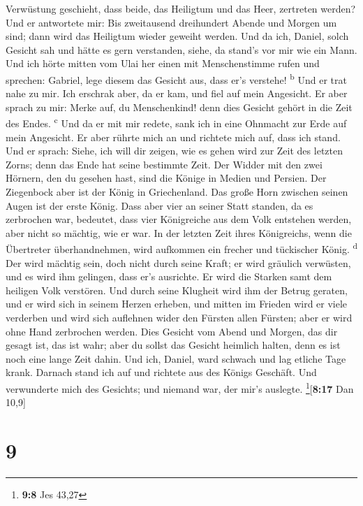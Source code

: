Verwüstung geschieht, dass beide, das Heiligtum und das Heer, zertreten
werden?  Und er antwortete mir: Bis zweitausend
dreihundert Abende und Morgen um sind; dann wird das Heiligtum wieder
geweiht werden.  Und da ich, Daniel, solch Gesicht sah
und hätte es gern verstanden, siehe, da stand's vor mir wie ein Mann.
 Und ich hörte mitten vom Ulai her einen mit
Menschenstimme rufen und sprechen: Gabriel, lege diesem das Gesicht aus,
dass er's verstehe! \textsuperscript{b}  Und er trat nahe
zu mir. Ich erschrak aber, da er kam, und fiel auf mein Angesicht. Er
aber sprach zu mir: Merke auf, du Menschenkind! denn dies Gesicht gehört
in die Zeit des Endes. \textsuperscript{c}  Und da er mit
mir redete, sank ich in eine Ohnmacht zur Erde auf mein Angesicht. Er
aber rührte mich an und richtete mich auf, dass ich stand.
 Und er sprach: Siehe, ich will dir zeigen, wie es gehen
wird zur Zeit des letzten Zorns; denn das Ende hat seine bestimmte Zeit.
 Der Widder mit den zwei Hörnern, den du gesehen hast,
sind die Könige in Medien und Persien.  Der Ziegenbock
aber ist der König in Griechenland. Das große Horn zwischen seinen Augen
ist der erste König.  Dass aber vier an seiner Statt
standen, da es zerbrochen war, bedeutet, dass vier Königreiche aus dem
Volk entstehen werden, aber nicht so mächtig, wie er war.
 In der letzten Zeit ihres Königreichs, wenn die
Übertreter überhandnehmen, wird aufkommen ein frecher und tückischer
König. \textsuperscript{d}  Der wird mächtig sein, doch
nicht durch seine Kraft; er wird gräulich verwüsten, und es wird ihm
gelingen, dass er's ausrichte. Er wird die Starken samt dem heiligen
Volk verstören.  Und durch seine Klugheit wird ihm der
Betrug geraten, und er wird sich in seinem Herzen erheben, und mitten im
Frieden wird er viele verderben und wird sich auflehnen wider den
Fürsten allen Fürsten; aber er wird ohne Hand zerbrochen werden.
 Dies Gesicht vom Abend und Morgen, das dir gesagt ist,
das ist wahr; aber du sollst das Gesicht heimlich halten, denn es ist
noch eine lange Zeit dahin.  Und ich, Daniel, ward
schwach und lag etliche Tage krank. Darnach stand ich auf und richtete
aus des Königs Geschäft. Und verwunderte mich des Gesichts; und niemand
war, der mir's auslegte. \footnote{\textbf{9:8} Jes 43,27}{[}\textbf{8:17}
Dan 10,9{]}

\hypertarget{section-8}{%
\section{9}\label{section-8}}

